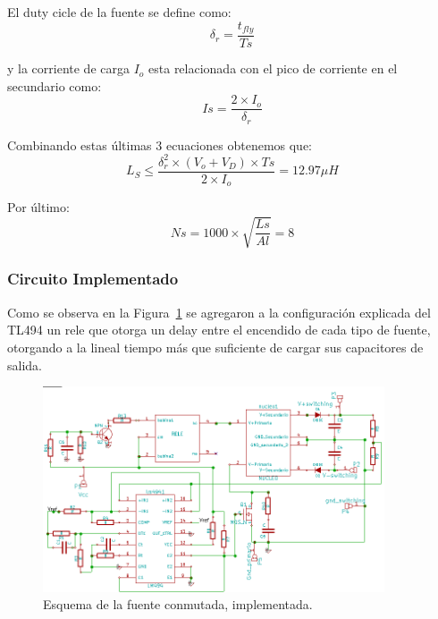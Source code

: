 El duty cicle de la fuente se define como:
$$
\delta_r= \frac{t_{fly}}{Ts}
$$

y la corriente de carga $I_o$ esta relacionada con el pico de corriente en el secundario
como:
$$
Is=\frac{2 \times I_o }{\delta_r}
$$

Combinando estas últimas 3 ecuaciones obtenemos que:
$$
L_S \leq \frac{\delta_r^2 \times (V_o + V_D) \times Ts}{2 \times I_o} =12.97\mu H
$$

Por último:
$$
Ns= 1000 \times \sqrt{\frac{Ls}{Al}}=8
$$
\medskip
\subsubsection{Circuito Implementado}

Como se observa en la Figura~\ref{conmutada_cir} se agregaron a la configuración explicada del TL494 un rele que otorga un delay entre el encendido de cada tipo de fuente, otorgando a la lineal tiempo más que suficiente de cargar sus capacitores de salida.

\begin{figure}[H]
\centering
\includegraphics[width=0.90\textwidth]{img/cir_conmutada.png}
\caption{Esquema  de la fuente conmutada, implementada.}
\label{conmutada_cir}
\end{figure}

\medskip
